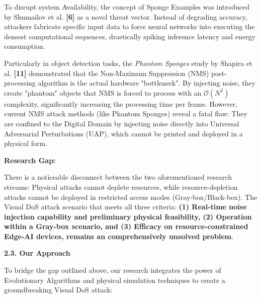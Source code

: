 \documentclass[]{article}
\begin{document}
To disrupt system Availability, the concept of Sponge Examples was introduced by Shumailov et al. \textbf{{[}6{]}} as a novel threat vector. Instead of degrading accuracy, attackers fabricate specific input data to force neural networks into executing the densest computational sequences, drastically spiking inference latency and energy consumption.

Particularly in object detection tasks, the \emph{Phantom Sponges} study by Shapira et al. \textbf{{[}11{]}} demonstrated that the Non-Maximum Suppression (NMS) post-processing algorithm is the actual hardware "bottleneck". By injecting noise, they create "phantom" objects that NMS is forced to process with an \(\mathcal{O}\left( N^{2} \right)\) complexity, significantly increasing the processing time per frame. However, current NMS attack methods (like Phantom Sponges) reveal a fatal flaw: They are confined to the Digital Domain by injecting noise directly into Universal Adversarial Perturbations (UAP), which cannot be printed and deployed in a physical form.

\textbf{Research Gap:}

There is a noticeable disconnect between the two aforementioned research streams: Physical attacks cannot deplete resources, while resource-depletion attacks cannot be deployed in restricted access modes (Gray-box/Black-box). The Visual DoS attack scenario that meets all three criteria: \textbf{(1) Real-time noise injection capability and preliminary physical feasibility, (2) Operation within a Gray-box scenario, and (3) Efficacy on resource-constrained Edge-AI devices, remains an comprehensively unsolved problem}.

\textbf{2.3. Our Approach}

To bridge the gap outlined above, our research integrates the power of Evolutionary Algorithms and physical simulation techniques to create a groundbreaking Visual DoS attack:
\end{document}
